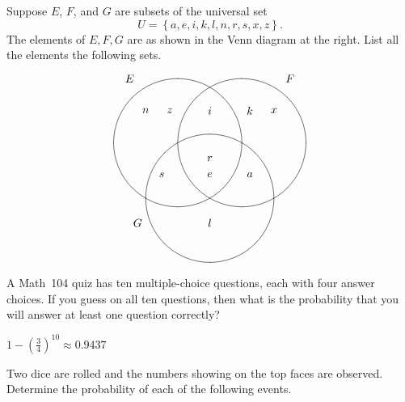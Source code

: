 \documentclass[answers,addpoints,12pt]{exam}
\begin{document}
\begin{questions}

\begin{multicols}{2}
\question[10]
Suppose $E$, $F$, and $G$ are subsets
of the universal set
\[U=\left\{a,e,i,k,l,n,r,s,x,z\right\}.\]
The elements of
$E,F,G$ are as shown in the Venn diagram
at the right.
List all the elements the following sets.
\[\begin{xy}<1cm,0cm>:
(-2.5,2)*{E};
(2.5,2)*{F};
(-2.25,-2.5)*{G};
(-1,0)*\cir<2cm>{};
(1,0)*\cir<2cm>{};
(0,-1.732)*\cir<2cm>{};
(-2,1)*{n};
(-1.25,1)*{z};
(-1.5,-1)*{s};
(0,1)*{i};
(0,-.5)*{r};
(0,-1)*{e};
(1.25,1)*{k};
(1.25,-1)*{a};
(2,1)*{x};
(0,-2.5)*{l};
\end{xy}\]
\end{multicols}

\question[10] A Math~104 quiz has ten multiple-choice
questions, each with four answer choices. If you guess on all
ten questions, then what is the probability that you will answer at
least one question correctly?
\begin{solution}[1in]
$1-\left(\frac{3}{4}\right)^{10}\approx 0.9437$
\end{solution}
\ifprintanswers\else\newpage\fi

\question[16] Two dice are rolled and the
numbers showing on the top faces are observed.
Determine the probability of each of the following events.
\end{questions}
\end{document}
